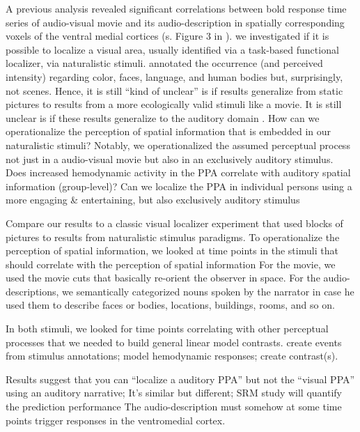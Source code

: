 %
A previous analysis \citep{hanke2016simultaneous} revealed significant
correlations between \ac{bold} response time series of audio-visual movie and
its audio-description in spatially corresponding voxels of the ventral medial
cortices (s. Figure 3 in \citep{hanke2016simultaneous}).
%
we investigated if it is possible to localize a visual area, usually
identified via a task-based functional localizer, via naturalistic stimuli.
%
\citep{bartels2004mapping} annotated the occurrence (and perceived intensity)
regarding color, faces, language, and human bodies but, surprisingly, not
scenes.
%
Hence, it is still ``kind of unclear'' is if results generalize from
static pictures to results from a more ecologically valid stimuli
like a movie.
%
It is still unclear is if these results generalize to the auditory domain
\citep{aziz2008modulation}.
%
How can we operationalize the perception of spatial information that is
embedded in our naturalistic stimuli?
%
Notably, we operationalized the assumed perceptual process not just in a
audio-visual movie but also in an exclusively auditory stimulus.
%
Does increased hemodynamic activity in the PPA correlate with auditory spatial
information (group-level)?
%
Can we localize the PPA in individual persons using a more engaging
\& entertaining, but also exclusively auditory stimulus

Compare our results to a classic visual localizer experiment that used blocks of
pictures to results from naturalistic stimulus paradigms.
%
To operationalize the perception of spatial information, we looked at time
points in the stimuli that should correlate with the perception of spatial
information
%
For the movie, we used the movie cuts that basically re-orient the observer in
space.
%
For the audio-descriptions, we semantically categorized nouns spoken by the
narrator in case he used them to describe faces or bodies, locations, buildings,
rooms, and so on.

%
In both stimuli, we looked for time points correlating with other perceptual
processes that we needed to build general linear model contrasts.
%
create events from stimulus annotations;
%
model hemodynamic responses;
%
create contrast(s).

%
Results suggest that you can ``localize a auditory PPA'' but not the ``visual
PPA'' using an auditory narrative; It's similar but different; SRM study will
quantify the prediction performance
%
The audio-description must somehow at some time points trigger responses in the
ventromedial cortex.

